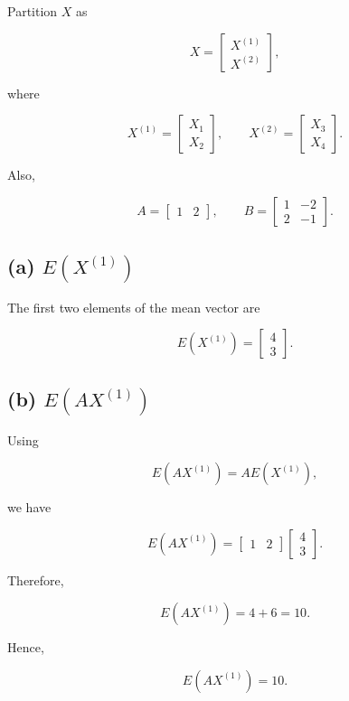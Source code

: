 \documentclass[12pt]{article}
\begin{document}
Partition $X$ as

\[
X=
\begin{bmatrix}
X^{(1)}\\
X^{(2)}
\end{bmatrix},
\]

where

\[
X^{(1)}
=
\begin{bmatrix}
X_1\\
X_2
\end{bmatrix},
\qquad
X^{(2)}
=
\begin{bmatrix}
X_3\\
X_4
\end{bmatrix}.
\]

Also,

\[
A=
\begin{bmatrix}
1&2
\end{bmatrix},
\qquad
B=
\begin{bmatrix}
1&-2\\
2&-1
\end{bmatrix}.
\]

\subsection*{(a) $E(X^{(1)})$}

The first two elements of the mean vector are

\[
\boxed{
E(X^{(1)})
=
\begin{bmatrix}
4\\
3
\end{bmatrix}
}.
\]

\subsection*{(b) $E(AX^{(1)})$}

Using

\[
E(AX^{(1)})=AE(X^{(1)}),
\]

we have

\[
E(AX^{(1)})
=
\begin{bmatrix}
1&2
\end{bmatrix}
\begin{bmatrix}
4\\
3
\end{bmatrix}.
\]

Therefore,

\[
E(AX^{(1)})=4+6=10.
\]

Hence,

\[
\boxed{E(AX^{(1)})=10}.
\]
\end{document}
